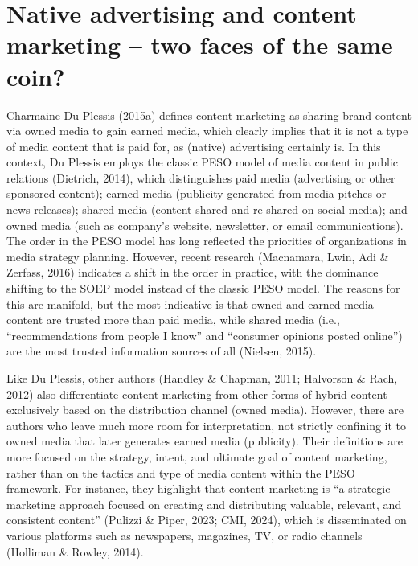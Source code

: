 \documentclass[preprint, 3p,
authoryear]{elsarticle} %
\begin{document}
\hypertarget{native-advertising-and-content-marketing-two-faces-of-the-same-coin}{%
\section{Native advertising and content marketing -- two faces of the
same
coin?}\label{native-advertising-and-content-marketing-two-faces-of-the-same-coin}}

Charmaine Du Plessis (2015a) defines content marketing as sharing brand
content via owned media to gain earned media, which clearly implies that
it is not a type of media content that is paid for, as (native)
advertising certainly is. In this context, Du Plessis employs the
classic PESO model of media content in public relations (Dietrich,
2014), which distinguishes paid media (advertising or other sponsored
content); earned media (publicity generated from media pitches or news
releases); shared media (content shared and re-shared on social media);
and owned media (such as company's website, newsletter, or email
communications). The order in the PESO model has long reflected the
priorities of organizations in media strategy planning. However, recent
research (Macnamara, Lwin, Adi \& Zerfass, 2016) indicates a shift in
the order in practice, with the dominance shifting to the SOEP model
instead of the classic PESO model. The reasons for this are manifold,
but the most indicative is that owned and earned media content are
trusted more than paid media, while shared media (i.e.,
``recommendations from people I know'' and ``consumer opinions posted
online'') are the most trusted information sources of all (Nielsen,
2015).

Like Du Plessis, other authors (Handley \& Chapman, 2011; Halvorson \&
Rach, 2012) also differentiate content marketing from other forms of
hybrid content exclusively based on the distribution channel (owned
media). However, there are authors who leave much more room for
interpretation, not strictly confining it to owned media that later
generates earned media (publicity). Their definitions are more focused
on the strategy, intent, and ultimate goal of content marketing, rather
than on the tactics and type of media content within the PESO framework.
For instance, they highlight that content marketing is ``a strategic
marketing approach focused on creating and distributing valuable,
relevant, and consistent content'' (Pulizzi \& Piper, 2023; CMI, 2024),
which is disseminated on various platforms such as newspapers,
magazines, TV, or radio channels (Holliman \& Rowley, 2014).
\end{document}
